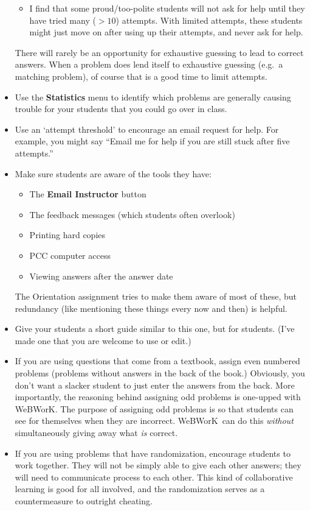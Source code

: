 \documentclass[12pt]{article}
\newcommand{\menu}[1]{\textbf{#1}}
\newcommand{\WW}{WeBWorK}
\begin{document}
\begin{itemize}
\begin{itemize}
\item I find that some proud/too-polite students will not ask for help until they have tried many ($>\!\!10$) attempts.   With limited attempts, these students might just move on after using up their attempts, and never ask for help.

\end{itemize}

There will rarely be an opportunity for exhaustive guessing to lead to correct answers.  When a problem does lend itself to exhaustive guessing (e.g.\ a matching problem), of course that is a good time to limit attempts.

\item Use the \menu{Statistics} menu to identify which problems are generally causing trouble for your students that you could go over in class.

\item Use an `attempt threshold' to encourage an email request for help.  For example, you might say ``Email me for help if you are still stuck after five attempts.''

\item Make sure students are aware of the tools they have:
\begin{itemize}
\item The \menu{Email Instructor} button
\item The feedback messages (which students often overlook)
\item Printing hard copies
\item PCC computer access
\item Viewing answers after the answer date
\end{itemize}
The Orientation assignment tries to make them aware of most of these, but redundancy (like mentioning these things every now and then) is helpful.

\item Give your students a short guide similar to this one, but for students.  (I've made one that you are welcome to use or edit.)  

\item If you are using questions that come from a textbook, assign even numbered problems (problems without answers in the back of the book.)  Obviously, you don't want a slacker student to just enter the answers from the back.  More importantly, the reasoning behind assigning odd problems is one-upped with \WW.  The purpose of assigning odd problems is so that students can see for themselves when they are incorrect.  \WW\ can do this \emph{without} simultaneously giving away what \emph{is} correct.

\item If you are using problems that have randomization, encourage students to work together. They will not be simply able to give each other answers; they will need to communicate process to each other. This kind of collaborative learning is good for all involved, and the randomization serves as a countermeasure to outright cheating.




\end{itemize}
\end{document}
